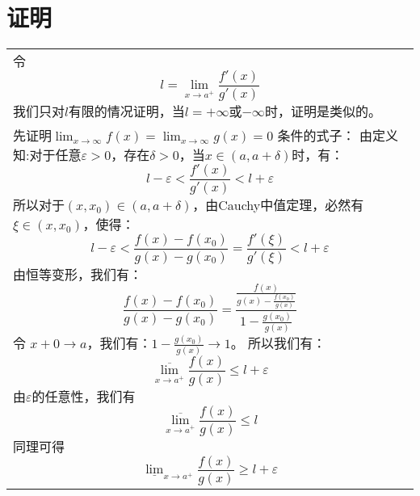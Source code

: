 \documentclass{ctexart}
\begin{document}
    \section{证明}
    \begin{tabular}{p{}}
        令
        \begin{equation}
            l = \lim_{x\rightarrow a^+}\frac{f'(x)}{g'(x)}
            \label{definition1}
        \end{equation}
        我们只对$l$有限的情况证明，当$l = +\infty$或$-\infty$时，证明是类似的。 \\
        先证明$\lim_{x\rightarrow\infty}f(x) = \lim_{x\rightarrow\infty}g(x) = 0$
        条件的式子：
        由定义知:对于任意$\varepsilon>0$，存在$\delta > 0$，当$x\in(a,a+\delta)$时，有：
        \begin{equation}
            l-\varepsilon < \frac{f'(x)}{g'(x)} < l + \varepsilon
            \label{equation1}
        \end{equation}
        所以对于$(x,x_0)\in(a,a+\delta)$，由Cauchy中值定理，必然有$\xi\in(x,x_0)$，使得：
        \begin{equation}
            l-\varepsilon < \frac{f(x) - f(x_0)}{g(x) - g(x_0)} =
            \frac{f'(\xi)}{g'(\xi)} < l + \varepsilon
            \label{equation2}
        \end{equation}
        由恒等变形，我们有：
        \begin{equation}
            \frac{f(x)-f(x_0)}{g(x)-g(x_0)} =
            \frac{\frac{f(x)}{g(x) - \frac{f(x_0)}{g(x)}}}
            {1 - \frac{g(x_0)}{g(x)}}
            \label{equation3}
        \end{equation}
        令 $x+0\rightarrow a$，我们有：$1-\frac{g(x_0)}{g(x)}\rightarrow1$。
        所以我们有：
        \begin{equation}
            \overline{\lim_{x\rightarrow a^+}}\frac{f(x)}{g(x)}\leqslant l+\varepsilon
            \label{equation4}
        \end{equation}
        由$\varepsilon$的任意性，我们有
        \begin{equation}
            \overline{\lim_{x\rightarrow a^+}}\frac{f(x)}{g(x)}\leqslant l
            \label{equation5}
        \end{equation}
        同理可得
        \begin{equation}
            \underline{\lim}_{x\rightarrow a^+}\frac{f(x)}{g(x)}\geqslant l+\varepsilon
            \label{equation6}
        \end{equation}

\end{tabular}
\end{document}
